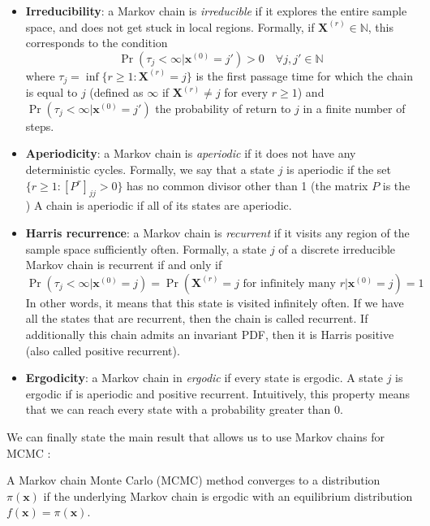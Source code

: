 \documentclass[12pt]{memoir}
\newcommand{\mb}{\mathbf}
\newcommand{\tb}{\textbf}
\newcommand{\ti}{\textit}
\begin{document}
\begin{itemize}
    \item \tb{Irreducibility}: a Markov chain is \ti{irreducible} if it explores the entire sample space, and does not get stuck in local regions. Formally, if $\mb X^{(r)}\in \mathbb{N}$, this corresponds to the condition 
    \begin{equation}
        \Pr(\tau_j < \infty | \mb x^{(0)} = j') > 0\quad \forall j,j' \in \mathbb{N}
    \end{equation} 
    where $\tau_j = \inf\{r\geq 1: \mb X^{(r)} = j\}$ is the first passage time for which the chain is equal to $j$ (defined as $\infty$ if $\mb X^{(r)} \neq j$ for every $r\geq 1$) and $\Pr(\tau_j < \infty | \mb x^{(0)} = j')$ the probability of return to $j$ in a finite number of steps.
    \item \tb{Aperiodicity}: a Markov chain is \ti{aperiodic} if it does not have any deterministic cycles. Formally, we say that a state $j$ is aperiodic if the set $\{r\geq1: [P^r]_{jj} > 0\}$ has no common divisor other than 1 (the matrix $P$ is the ) A chain is aperiodic if all of its states are aperiodic.
    \item \tb{Harris recurrence}:  a Markov chain is \ti{recurrent} if it visits any region of the sample space sufficiently often. Formally, a state $j$ of a discrete irreducible Markov chain is recurrent if and only if
    \begin{equation}
        \Pr(\tau_j < \infty |\mb x^{(0)} = j) = \Pr(\mb X^{(r)} = j \text{ for infinitely many } r | \mb x^{(0)}=j) = 1
    \end{equation}
    In other words, it means that this state is visited infinitely often. If we have all the states that are recurrent, then the chain is called recurrent. If additionally this chain admits an invariant PDF, then it is Harris positive (also called positive recurrent).
    \item \tb{Ergodicity}: a Markov chain in \ti{ergodic} if every state is ergodic. A state $j$ is ergodic if is aperiodic and positive recurrent. Intuitively, this property means that we can reach every state with a probability greater than 0.
\end{itemize}
We can finally state the main result that allows us to use Markov chains for MCMC \cite{mcmc:RobertCasella2004}:
\begin{boxedthm}
    A Markov chain Monte Carlo (MCMC) method converges to a distribution $\pi(\mb x)$ if the underlying Markov chain is ergodic with an equilibrium distribution $f(\mb x) = \pi (\mb x)$.
\end{boxedthm}
\end{document}
